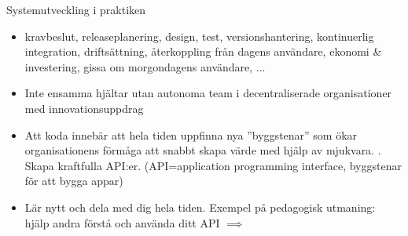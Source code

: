 


\begin{SlideExtra}{Systemutveckling i praktiken}
\begin{itemize}
\item {} kravbeslut, releaseplanering, design, test, versionshantering, kontinuerlig integration, driftsättning, återkoppling från dagens användare, ekonomi \& investering, gissa om morgondagens användare, ...
\item {} Inte ensamma hjältar utan autonoma team i decentraliserade organisationer med innovationsuppdrag
\item {} Att koda innebär att hela tiden uppfinna nya ''byggstenar'' som ökar organisationens förmåga att snabbt skapa värde med hjälp av mjukvara. . Skapa kraftfulla API:er. (API=application programming interface, byggstenar för att bygga appar)
\item {} Lär nytt och dela med dig hela tiden. Exempel på pedagogisk utmaning: hjälp andra förstå och använda ditt API $\implies$ 
\end{itemize}
\end{SlideExtra}


\fi %



